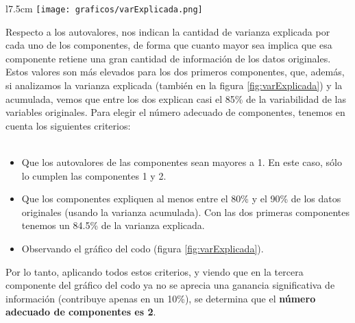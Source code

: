 \documentclass[a4paper,onecolumn]{extarticle}
\begin{document}
\begin{sloppypar}
\begin{wrapfigure}[14]{l}{7.5cm}
    \texttt{[image: graficos/varExplicada.png]}
    \small{\caption{Variabilidad Explicada} \label{fig:varExplicada}}
\end{wrapfigure} 
Respecto a los autovalores, nos indican la cantidad de varianza explicada por cada uno de los componentes, de forma que cuanto mayor sea implica que esa 
componente retiene una gran cantidad de información de los datos originales. Estos valores son más elevados para los dos primeros componentes, que, además,
si analizamos la varianza explicada (también en la figura \ref{fig:varExplicada}) y la acumulada, vemos que entre los dos explican casi el 85\% de la 
variabilidad de las variables originales. Para elegir el número adecuado de componentes, tenemos en cuenta los siguientes criterios:
\\
\\
\begin{itemize}
    \item Que los autovalores de las componentes sean mayores a 1. En este caso, sólo lo cumplen las componentes 1 y 2.
    \item Que los componentes expliquen al menos entre el 80\% y el 90\% de los datos originales (usando la varianza acumulada). Con las dos primeras
    componentes tenemos un 84.5\% de la varianza explicada.
    \item Observando el gráfico del codo (figura \ref{fig:varExplicada}).
\end{itemize}

Por lo tanto, aplicando todos estos criterios, y viendo que en la tercera componente del gráfico del codo ya no se aprecia una ganancia significativa de 
información (contribuye apenas en un 10\%), se determina que el \textbf{número adecuado de componentes es 2}.


\end{sloppypar}
\end{document}
